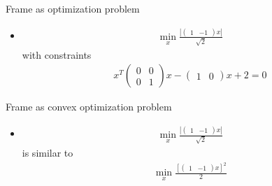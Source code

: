 \documentclass{beamer}
\begin{document}
\begin{frame}{Frame as optimization problem}

\begin{itemize}
  \item {
 \begin{align}
\min_x
 \frac{|\begin{pmatrix}
		1 & -1
		\end{pmatrix}x|}{\sqrt{2}}
 \end{align}
 with constraints
 \begin{align}
  x^{T}\begin{pmatrix}
		0 & 0\\
		0 & 1
		\end{pmatrix}x-\begin{pmatrix}
		1 & 0
		\end{pmatrix}x+2=0
 \end{align}

  }
 \end{itemize}
  
\end{frame}

\begin{frame}{Frame as convex optimization problem}

\begin{itemize}
  \item {
 \begin{align}
\min_x
 \frac{|\begin{pmatrix}
		1 & -1
		\end{pmatrix}x|}{\sqrt{2}}
 \end{align}
 is similar to 
 \begin{align}
\min_x
 \frac{[\begin{pmatrix}
		1 & -1
		\end{pmatrix}x]^2}{2}
 \end{align}
  }
 \end{itemize}
  
\end{frame}
\end{document}
